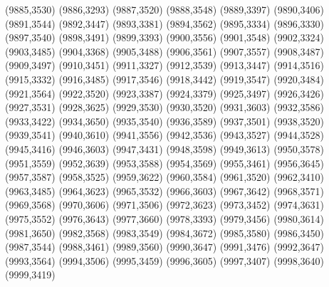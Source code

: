 (9885,3530)
(9886,3293)
(9887,3520)
(9888,3548)
(9889,3397)
(9890,3406)
(9891,3544)
(9892,3447)
(9893,3381)
(9894,3562)
(9895,3334)
(9896,3330)
(9897,3540)
(9898,3491)
(9899,3393)
(9900,3556)
(9901,3548)
(9902,3324)
(9903,3485)
(9904,3368)
(9905,3488)
(9906,3561)
(9907,3557)
(9908,3487)
(9909,3497)
(9910,3451)
(9911,3327)
(9912,3539)
(9913,3447)
(9914,3516)
(9915,3332)
(9916,3485)
(9917,3546)
(9918,3442)
(9919,3547)
(9920,3484)
(9921,3564)
(9922,3520)
(9923,3387)
(9924,3379)
(9925,3497)
(9926,3426)
(9927,3531)
(9928,3625)
(9929,3530)
(9930,3520)
(9931,3603)
(9932,3586)
(9933,3422)
(9934,3650)
(9935,3540)
(9936,3589)
(9937,3501)
(9938,3520)
(9939,3541)
(9940,3610)
(9941,3556)
(9942,3536)
(9943,3527)
(9944,3528)
(9945,3416)
(9946,3603)
(9947,3431)
(9948,3598)
(9949,3613)
(9950,3578)
(9951,3559)
(9952,3639)
(9953,3588)
(9954,3569)
(9955,3461)
(9956,3645)
(9957,3587)
(9958,3525)
(9959,3622)
(9960,3584)
(9961,3520)
(9962,3410)
(9963,3485)
(9964,3623)
(9965,3532)
(9966,3603)
(9967,3642)
(9968,3571)
(9969,3568)
(9970,3606)
(9971,3506)
(9972,3623)
(9973,3452)
(9974,3631)
(9975,3552)
(9976,3643)
(9977,3660)
(9978,3393)
(9979,3456)
(9980,3614)
(9981,3650)
(9982,3568)
(9983,3549)
(9984,3672)
(9985,3580)
(9986,3450)
(9987,3544)
(9988,3461)
(9989,3560)
(9990,3647)
(9991,3476)
(9992,3647)
(9993,3564)
(9994,3506)
(9995,3459)
(9996,3605)
(9997,3407)
(9998,3640)
(9999,3419)
